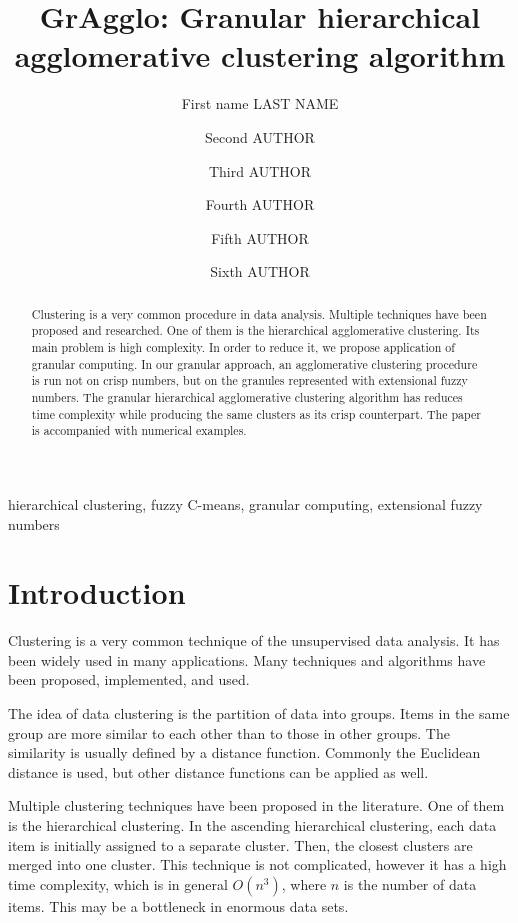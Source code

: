 \documentclass{amcs}
\title{GrAgglo: Granular hierarchical agglomerative clustering algorithm}
\author[ad1][ad2]{First name LAST NAME}
\author[ad1][]{Second AUTHOR}
\author[ad1][ad2]{Third AUTHOR}
\author[ad2][]{Fourth AUTHOR}
\author[ad1][ad2]{Fifth AUTHOR}
\author[ad2][]{Sixth AUTHOR}
\newcommand{\efn}{extensional fuzzy number}
\begin{document}
\kslistofremarks




\begin{abstract}
	
Clustering is a very common procedure in data analysis.
Multiple techniques have been proposed and researched.
One of them is the hierarchical agglomerative clustering.
Its main problem is high complexity. 
In order to reduce it, we propose application of granular computing.
In our granular approach, an agglomerative clustering procedure is run not on crisp numbers, but on the granules represented with \efn s.	
The granular hierarchical agglomerative clustering algorithm has reduces time complexity while producing the same clusters as its crisp counterpart.
The paper is accompanied with numerical examples.

\end{abstract}
\begin{keywords}
   hierarchical clustering, fuzzy C-means, granular computing, extensional fuzzy numbers
\end{keywords}
\maketitle

\section{Introduction}

Clustering is a very common technique of the unsupervised data analysis. 
It has been widely used in many applications.
Many techniques and algorithms have been proposed, implemented, and used. 

The idea of data clustering is the partition of data into groups.
Items in the same group are more similar to each other than to those in other groups. 
The similarity is usually defined by a distance function.
Commonly the Euclidean distance is used, but other distance functions can be applied as well. 

Multiple clustering techniques have been proposed in the literature.
One of them is the hierarchical clustering.
In the ascending hierarchical clustering, each data item is initially assigned to a separate cluster. 
Then, the closest clusters are merged into one cluster.
This technique is not complicated, however it has a high time complexity, which is in general $O(n^3)$, where $n$ is the number of data items.
This may be a bottleneck in enormous data sets. 
\end{document}
